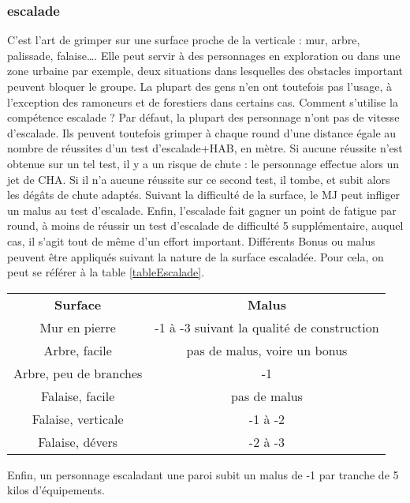 \documentclass[10pt,a4paper,twocolumn]{book}
\begin{document}
\subsubsection{escalade}
C’est l’art de grimper sur une surface proche de la verticale : mur, arbre, palissade, falaise…. Elle peut servir à des personnages en exploration ou dans une zone urbaine par exemple, deux situations dans lesquelles des obstacles important peuvent bloquer le groupe. La plupart des gens n’en ont toutefois pas l’usage, à l’exception des ramoneurs et de forestiers dans certains cas.
Comment s’utilise la compétence escalade ?
Par défaut, la plupart des personnage n’ont pas de vitesse d’escalade. Ils peuvent toutefois grimper à chaque round d’une distance égale au nombre de réussites d’un test d’escalade+HAB, en mètre.
Si aucune réussite n’est obtenue sur un tel test, il y a un risque de chute : le personnage effectue alors un jet de CHA. Si il n’a aucune réussite sur ce second test, il tombe, et subit alors les dégâts de chute adaptés.
Suivant la difficulté de la surface, le MJ peut infliger un malus au test d’escalade.
Enfin, l’escalade fait gagner un point de fatigue par round, à moins de réussir un test d’escalade de difficulté 5 supplémentaire, auquel cas, il s’agit tout de même d’un effort important.
Différents Bonus ou malus peuvent être appliqués suivant la nature de la surface escaladée. Pour cela, on peut se référer à la table \ref{tableEscalade}.
\begin{table*}
\caption{ Surfaces d'escalade :}
\label{tableEscalade}
\begin{center}
\begin{tabular}{cc}
\textbf{Surface} & \textbf{Malus} \\
   Mur en pierre & -1 à -3 suivant la qualité de construction\\
   Arbre, facile & pas de malus, voire un bonus\\
   Arbre, peu de branches & -1\\
   Falaise, facile & pas de malus\\
   Falaise, verticale & -1 à -2\\
   Falaise, dévers & -2 à -3\\
\end{tabular}
\end{center}
\end{table*}

Enfin, un personnage escaladant une paroi subit un malus de -1 par tranche de 5 kilos d’équipements.
\end{document}
